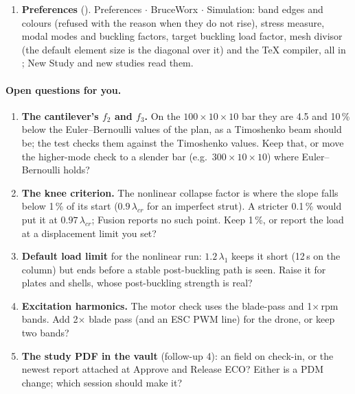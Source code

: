 \begin{enumerate}[nosep]
        was invented: attaching the study PDF needs either an  field on the check-in event (PDM
        schema, , which another session is editing) or the newest
        report offered as an attachment at Approve and Release ECO (question~5).
  \item \textbf{Preferences} (). Preferences $\cdot$ BruceWorx $\cdot$ Simulation: band edges and colours
        (refused with the reason when they do not rise), stress measure, modal modes and buckling factors, target
        buckling load factor, mesh divisor (the default element size is the diagonal over it) and the TeX compiler,
        all in ; New Study and new studies read them.
\end{enumerate}

\paragraph{Open questions for you.}
\begin{enumerate}[nosep]
  \item \textbf{The cantilever's $f_2$ and $f_3$.} On the $100\times10\times10$ bar they are 4.5 and 10\,\% below the
        Euler--Bernoulli values of the plan, as a Timoshenko beam should be; the test checks them against the
        Timoshenko values. Keep that, or move the higher-mode check to a slender bar (e.g.\ $300\times10\times10$) where
        Euler--Bernoulli holds?
  \item \textbf{The knee criterion.} The nonlinear collapse factor is where the slope falls below 1\,\% of its start
        ($0.9\,\lambda_{cr}$ for an imperfect strut). A stricter 0.1\,\% would put it at $0.97\,\lambda_{cr}$; Fusion
        reports no such point. Keep 1\,\%, or report the load at a displacement limit you set?
  \item \textbf{Default load limit} for the nonlinear run: $1.2\,\lambda_1$ keeps it short (12\,s on the column) but
        ends before a stable post-buckling path is seen. Raise it for plates and shells, whose post-buckling
        strength is real?
  \item \textbf{Excitation harmonics.} The motor check uses the blade-pass and 1$\times$\,rpm bands. Add 2$\times$ blade
        pass (and an ESC PWM line) for the drone, or keep two bands?
  \item \textbf{The study PDF in the vault} (follow-up 4): an  field on check-in, or the newest report
        attached at Approve and Release ECO? Either is a PDM change; which session should make it?
\end{enumerate}

